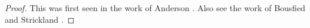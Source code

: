 \documentclass[11pt]{amsart}
\DeclareMathOperator{\id}{id}
\theoremstyle{remark}
\theoremstyle{definition}
\begin{document}
\begin{proof}
This was first seen in the work of Anderson \cite{Anderson}. Also see the work of Bousfied and Strickland \cite{Bousfield,Strickland}.
\end{proof}
\end{document}
